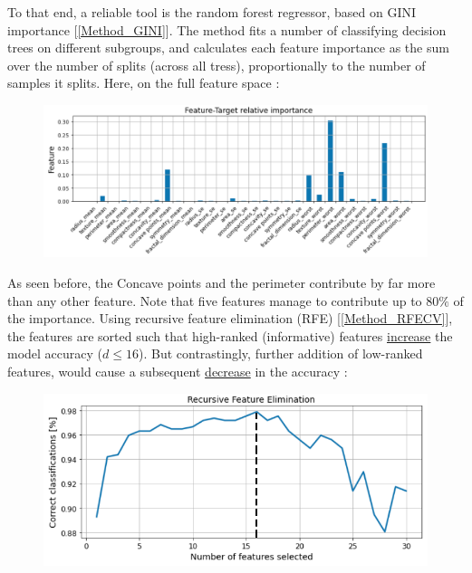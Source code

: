 \documentclass[12pt]{article}
\numberwithin{equation}{section}
\begin{document}
\begin{flushleft}
To that end, a reliable tool is the random forest regressor,  based on GINI importance  [\ref{Method_GINI}]. The method fits a number of classifying decision trees on different subgroups, and calculates each feature importance as the sum over the number of splits (across all tress), proportionally to the number of samples it splits. Here, on the full feature space : 
\begin{figure}[H]
\centering
\includegraphics[width=1.075\linewidth, center]{Feature_imp.png}
\end{figure}
As seen before, the Concave points and the perimeter contribute by far more than any other feature. Note that five features manage to contribute up to $80 \%$ of the importance. Using recursive feature elimination (RFE) [\ref{Method_RFECV}], the features are sorted such that high-ranked (informative) features \underline{increase} the model accuracy ($d \leq 16$). But contrastingly, further addition of low-ranked features, would cause a subsequent \underline{decrease} in the accuracy :

\begin{figure}[H]
\centering
\includegraphics[width=0.9\linewidth, center]{RFECV.png}
\end{figure}


\end{flushleft}
\end{document}
